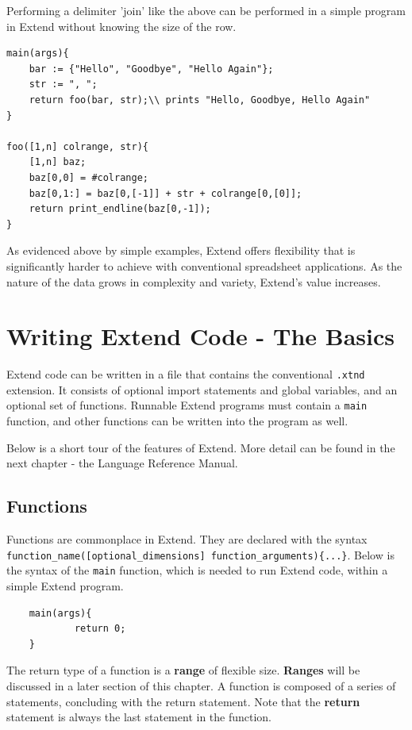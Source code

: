 \medskip \noindent Performing a delimiter 'join' like the above can be performed in a simple program in Extend without knowing the size of the row.

\begin{lstlisting}
main(args){
	bar := {"Hello", "Goodbye", "Hello Again"};
	str := ", ";
	return foo(bar, str);\\ prints "Hello, Goodbye, Hello Again"
}

foo([1,n] colrange, str){
	[1,n] baz;
	baz[0,0] = #colrange;
	baz[0,1:] = baz[0,[-1]] + str + colrange[0,[0]];
	return print_endline(baz[0,-1]);
}
\end{lstlisting}

\medskip \noindent As evidenced above by simple examples, Extend offers flexibility that is significantly harder to achieve with conventional spreadsheet applications. As the nature of the data grows in complexity and variety, Extend's value increases.

\section{Writing Extend Code - The Basics}
Extend code can be written in a file that contains the conventional \texttt{.xtnd} extension. It consists of optional import statements and global variables, and an optional set of functions. Runnable Extend programs must contain a \texttt{main} function, and other functions can be written into the program as well.

\medskip \noindent
Below is a short tour of the features of Extend. More detail can be found in the next chapter - the Language Reference Manual.

	\subsection{Functions}
	Functions are commonplace in Extend. They are declared with the syntax \texttt{function\_name([optional\_dimensions] function\_arguments)\{...\}}. Below is the syntax of the \texttt{main} function, which is needed to run Extend code, within a simple Extend program.

	\begin{lstlisting}
	main(args){
			return 0;
	}
	\end{lstlisting}

	\medskip \noindent
 	The return type of a function is a \textbf{range} of flexible size. \textbf{Ranges} will be discussed in a later section of this chapter. A function is composed of a series of statements, concluding with the return statement.
	Note that the \textbf{return} statement is always the last statement in the function.

